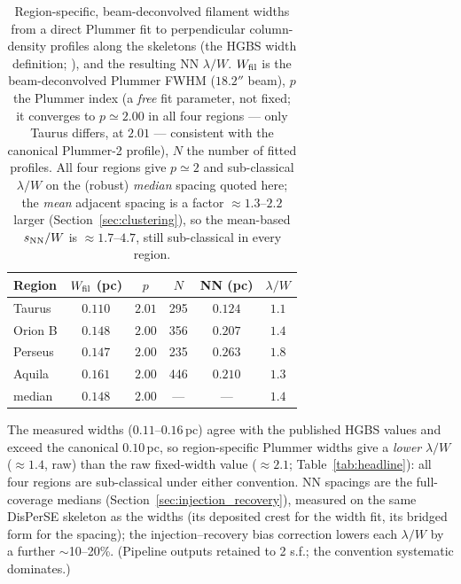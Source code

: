 \documentclass[usenatbib,twoside,twocolumn]{mnras}
\begin{document}
\begin{table}
\caption{Region-specific, beam-deconvolved filament widths from a direct Plummer fit to perpendicular column-density profiles along the skeletons (the HGBS width definition; \citealt{Arzoumanian2019}), and the resulting NN $\lambda/W$. $W_{\rm fil}$ is the beam-deconvolved Plummer FWHM ($18.2''$ beam), $p$ the Plummer index (a \emph{free} fit parameter, not fixed; it converges to $p\simeq2.00$ in all four regions --- only Taurus differs, at $2.01$ --- consistent with the canonical Plummer-2 profile), $N$ the number of fitted profiles. All four regions give $p\simeq2$ and sub-classical $\lambda/W$ on the (robust) \emph{median} spacing quoted here; the \emph{mean} adjacent spacing is a factor $\approx1.3$--$2.2$ larger (Section~\ref{sec:clustering}), so the mean-based $s_{\rm NN}/W$ is $\approx1.7$--$4.7$, still sub-classical in every region.}
\label{tab:widths}
\footnotesize
\setlength{\tabcolsep}{3pt}
\begin{tabular}{p{1.7cm}ccccc}
\toprule
Region & $W_{\rm fil}$ (pc) & $p$ & $N$ & NN (pc) & $\lambda/W$ \\
\midrule
Taurus  & $0.110$ & $2.01$ & 295 & $0.124$ & $1.1$ \\
Orion B & $0.148$ & $2.00$ & 356 & $0.207$ & $1.4$ \\
Perseus & $0.147$ & $2.00$ & 235 & $0.263$ & $1.8$ \\
Aquila  & $0.161$ & $2.00$ & 446 & $0.210$ & $1.3$ \\
\midrule
median  & $0.148$ & $2.00$ & --- & --- & $1.4$ \\
\bottomrule
\end{tabular}
\par\vspace{2pt}
\footnotesize The measured widths ($0.11$--$0.16$\,pc) agree with the published HGBS values and exceed the canonical $0.10$\,pc, so region-specific Plummer widths give a \emph{lower} $\lambda/W$ ($\approx1.4$, raw) than the raw fixed-width value ($\approx2.1$; Table~\ref{tab:headline}): all four regions are sub-classical under either convention. NN spacings are the full-coverage medians (Section~\ref{sec:injection_recovery}), measured on the same DisPerSE skeleton as the widths (its deposited crest for the width fit, its bridged form for the spacing); the injection--recovery bias correction lowers each $\lambda/W$ by a further $\sim$10--20\%. (Pipeline outputs retained to 2 s.f.; the convention systematic dominates.)
\end{table}
\end{document}
